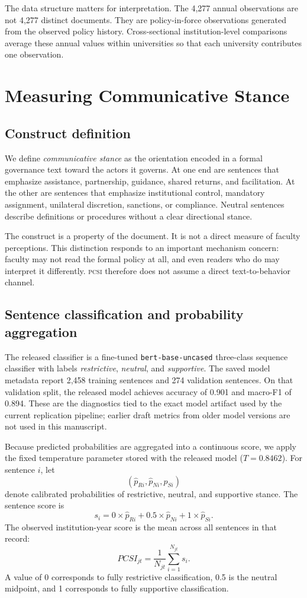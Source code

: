 \documentclass[12pt]{article}
\newcommand{\PCSI}{\textsc{pcsi}}
\begin{document}
The data structure matters for interpretation. The 4,277 annual observations are not 4,277 distinct documents. They are policy-in-force observations generated from the observed policy history. Cross-sectional institution-level comparisons average these annual values within universities so that each university contributes one observation.

\section{Measuring Communicative Stance}

\subsection{Construct definition}

We define \emph{communicative stance} as the orientation encoded in a formal governance text toward the actors it governs. At one end are sentences that emphasize assistance, partnership, guidance, shared returns, and facilitation. At the other are sentences that emphasize institutional control, mandatory assignment, unilateral discretion, sanctions, or compliance. Neutral sentences describe definitions or procedures without a clear directional stance.

The construct is a property of the document. It is not a direct measure of faculty perceptions. This distinction responds to an important mechanism concern: faculty may not read the formal policy at all, and even readers who do may interpret it differently. \PCSI{} therefore does not assume a direct text-to-behavior channel.

\subsection{Sentence classification and probability aggregation}

The released classifier is a fine-tuned \texttt{bert-base-uncased} three-class sequence classifier with labels \emph{restrictive}, \emph{neutral}, and \emph{supportive}. The saved model metadata report 2,458 training sentences and 274 validation sentences. On that validation split, the released model achieves accuracy of 0.901 and macro-F1 of 0.894. These are the diagnostics tied to the exact model artifact used by the current replication pipeline; earlier draft metrics from older model versions are not used in this manuscript.

Because predicted probabilities are aggregated into a continuous score, we apply the fixed temperature parameter stored with the released model ($T=0.8462$). For sentence $i$, let
\[
(\hat p_{Ri},\hat p_{Ni},\hat p_{Si})
\]
denote calibrated probabilities of restrictive, neutral, and supportive stance. The sentence score is
\[
s_i = 0\times \hat p_{Ri} + 0.5\times \hat p_{Ni} + 1\times \hat p_{Si}.
\]
The observed institution-year score is the mean across all sentences in that record:
\[
PCSI_{jt}=\frac{1}{N_{jt}}\sum_{i=1}^{N_{jt}}s_i.
\]
A value of 0 corresponds to fully restrictive classification, 0.5 is the neutral midpoint, and 1 corresponds to fully supportive classification.
\end{document}
